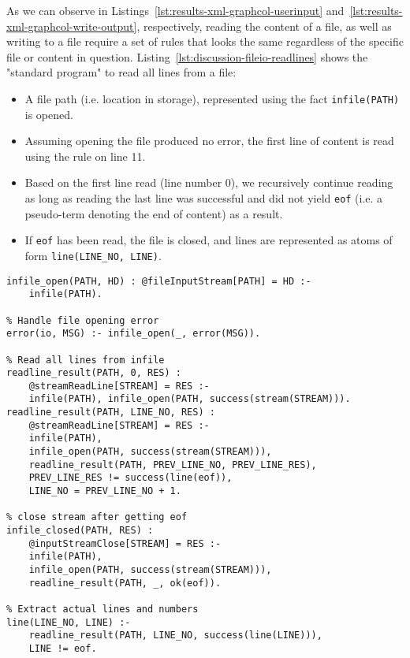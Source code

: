 As we can observe in Listings~\ref{lst:results-xml-graphcol-userinput} and~\ref{lst:results-xml-graphcol-write-output}, respectively, reading the content of a file, as well as writing to a file require a set of rules that looks the same regardless of the specific file or content in question. Listing~\ref{lst:discussion-fileio-readlines} shows the "standard program" to read all lines from a file:
\begin{itemize}
	\item A file path (i.e. location in storage), represented using the fact \texttt{infile(PATH)} is opened.
	\item Assuming opening the file produced no error, the first line of content is read using the rule on line 11.
	\item Based on the first line read (line number 0), we recursively continue reading as long as reading the last line was successful and did not yield \texttt{eof} (i.e. a pseudo-term denoting the end of content) as a result.
	\item If \texttt{eof} has been read, the file is closed, and lines are represented as atoms of form \texttt{line(LINE\_NO, LINE)}.
\end{itemize}	

\begin{lstlisting}[style=asp-code, label={lst:discussion-fileio-readlines}, caption={Reading all lines from a file.}]
infile_open(PATH, HD) : @fileInputStream[PATH] = HD :- 
	infile(PATH).

% Handle file opening error
error(io, MSG) :- infile_open(_, error(MSG)).

% Read all lines from infile 
readline_result(PATH, 0, RES) : 
	@streamReadLine[STREAM] = RES :- 
	infile(PATH), infile_open(PATH, success(stream(STREAM))).
readline_result(PATH, LINE_NO, RES) : 
	@streamReadLine[STREAM] = RES :- 
	infile(PATH), 
	infile_open(PATH, success(stream(STREAM))), 
	readline_result(PATH, PREV_LINE_NO, PREV_LINE_RES), 
	PREV_LINE_RES != success(line(eof)), 
	LINE_NO = PREV_LINE_NO + 1.

% close stream after getting eof
infile_closed(PATH, RES) : 
	@inputStreamClose[STREAM] = RES :- 
	infile(PATH), 
	infile_open(PATH, success(stream(STREAM))),
	readline_result(PATH, _, ok(eof)).

% Extract actual lines and numbers
line(LINE_NO, LINE) :- 
	readline_result(PATH, LINE_NO, success(line(LINE))), 
	LINE != eof.
\end{lstlisting}	

